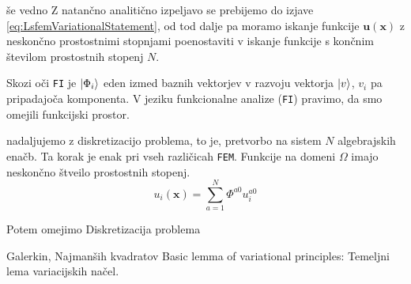 še vedno  Z natančno analitično izpeljavo se prebijemo do izjave \eqref{eq:LsfemVariationalStatement}, od tod dalje pa moramo iskanje funkcije $\mathbf{u(x)}$ z neskončno prostostnimi stopnjami poenostaviti v iskanje funkcije s končnim številom prostostnih stopenj $N$. 

Skozi oči \texttt{FI} je $\ket{\Phi_i}$ eden izmed baznih vektorjev v razvoju vektorja $\ket{v}$, $v_i$ pa pripadajoča komponenta.
V jeziku funkcionalne analize (\texttt{FI}) pravimo, da smo omejili funkcijski prostor.

nadaljujemo z diskretizacijo problema, to je, pretvorbo na sistem $N$ algebrajskih enačb. Ta korak je enak pri vseh različicah \texttt{FEM}. Funkcije na domeni $\Omega$ imajo neskončno štveilo prostostnih stopenj. 
\begin{equation}
    u_i(\mathbf{x}) = \sum_{a = 1}^N \Phi^{a0} u^{a0}_i
\end{equation}

Potem omejimo Diskretizacija problema 

Galerkin, Najmanših kvadratov \cite{JiangB-LSFEM}
Basic lemma of variational principles: Temeljni lema variacijskih načel.